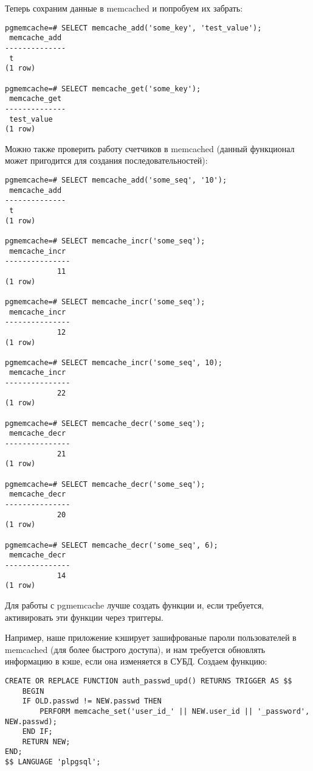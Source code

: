 Теперь сохраним данные в memcached и попробуем их забрать:
\begin{lstlisting}[label=lst:pgcache8,caption=Проверка]
pgmemcache=# SELECT memcache_add('some_key', 'test_value');
 memcache_add 
--------------
 t
(1 row)

pgmemcache=# SELECT memcache_get('some_key');
 memcache_get 
--------------
 test_value
(1 row)

\end{lstlisting}

Можно также проверить работу счетчиков в memcached (данный функционал может пригодится для создания последовательностей):
\begin{lstlisting}[label=lst:pgcache9,caption=Проверка]
pgmemcache=# SELECT memcache_add('some_seq', '10');
 memcache_add 
--------------
 t
(1 row)

pgmemcache=# SELECT memcache_incr('some_seq');
 memcache_incr 
---------------
            11
(1 row)

pgmemcache=# SELECT memcache_incr('some_seq');
 memcache_incr 
---------------
            12
(1 row)

pgmemcache=# SELECT memcache_incr('some_seq', 10);
 memcache_incr 
---------------
            22
(1 row)

pgmemcache=# SELECT memcache_decr('some_seq');
 memcache_decr 
---------------
            21
(1 row)

pgmemcache=# SELECT memcache_decr('some_seq');
 memcache_decr 
---------------
            20
(1 row)

pgmemcache=# SELECT memcache_decr('some_seq', 6);
 memcache_decr 
---------------
            14
(1 row)

\end{lstlisting}

Для работы с pgmemcache лучше создать функции и, если требуется, активировать эти функции через триггеры. 

Например, наше приложение кэширует зашифрованые пароли пользователей в memcached 
(для более быстрого доступа), 
и нам требуется обновлять информацию в кэше, если она изменяется в СУБД. Создаем функцию:
\begin{lstlisting}[label=lst:pgcache10,caption=Функция для обновления данных в кэше]
CREATE OR REPLACE FUNCTION auth_passwd_upd() RETURNS TRIGGER AS $$
	BEGIN
	IF OLD.passwd != NEW.passwd THEN
		PERFORM memcache_set('user_id_' || NEW.user_id || '_password', NEW.passwd);
	END IF;
	RETURN NEW;
END;
$$ LANGUAGE 'plpgsql';
\end{lstlisting}


